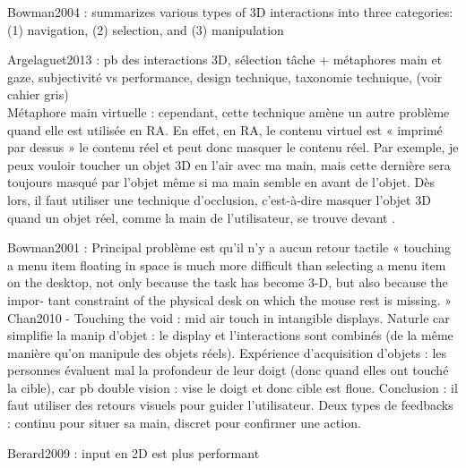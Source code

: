 Bowman2004 : summarizes various types of 3D interactions into three categories: (1) navigation, (2) selection, and (3)
manipulation

Argelaguet2013 : pb des interactions 3D, sélection tâche + métaphores main et gaze, subjectivité vs performance, design technique, taxonomie technique,  (voir cahier gris)\\
Métaphore main virtuelle : cependant, cette technique amène un autre problème quand elle est utilisée en RA. En effet, en RA, le contenu virtuel est « imprimé par dessus » le contenu réel et peut donc masquer le contenu réel. Par exemple, je peux vouloir toucher un objet 3D en l'air avec ma main, mais cette dernière sera toujours masqué par l'objet même si ma main semble en avant de l'objet. Dès lors, il faut utiliser une technique d'occlusion, c'est-à-dire masquer l'objet 3D quand un objet réel, comme la main de l'utilisateur, se trouve devant .



Bowman2001 : Principal problème est qu'il n'y a aucun retour tactile « touching a menu item floating in space is much more difficult than selecting a menu item on the desktop, not only because the task has become 3-D, but also because the impor- tant constraint of the physical desk on which the mouse rest is missing. »\\
Chan2010 - Touching the void : mid air touch in intangible displays. Naturle car simplifie la manip d'objet : le display et l'interactions sont combinés (de la même manière qu'on manipule des objets réels). Expérience d'acquisition d'objets : les personnes évaluent mal la profondeur de leur doigt (donc quand elles ont touché la cible), car pb double vision : vise le doigt et donc cible est floue. Conclusion : il faut utiliser des retours visuels pour guider l'utilisateur. Deux types de feedbacks : continu pour situer sa main, discret pour confirmer une action.

Berard2009 : input en 2D est plus performant

